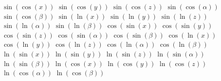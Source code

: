 $ \sin(\cos(x)) $
$ \sin(\cos(y)) $
$ \sin(\cos(z)) $
$ \sin(\cos(\alpha)) $
$ \sin(\cos(\beta)) $
$ \sin(\ln(x)) $
$ \sin(\ln(y)) $
$ \sin(\ln(z)) $
$ \sin(\ln(\alpha)) $
$ \sin(\ln(\beta)) $
$ \cos(\sin(x)) $
$ \cos(\sin(y)) $
$ \cos(\sin(z)) $
$ \cos(\sin(\alpha)) $
$ \cos(\sin(\beta)) $
$ \cos(\ln(x)) $
$ \cos(\ln(y)) $
$ \cos(\ln(z)) $
$ \cos(\ln(\alpha)) $
$ \cos(\ln(\beta)) $
$ \ln(\sin(x)) $
$ \ln(\sin(y)) $
$ \ln(\sin(z)) $
$ \ln(\sin(\alpha)) $
$ \ln(\sin(\beta)) $
$ \ln(\cos(x)) $
$ \ln(\cos(y)) $
$ \ln(\cos(z)) $
$ \ln(\cos(\alpha)) $
$ \ln(\cos(\beta)) $
